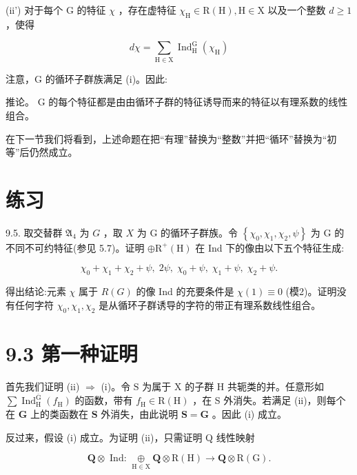 \documentclass[10pt]{article}
\begin{document}
(ii’) 对于每个 \(\mathrm{G}\) 的特征 \(\chi\) ，存在虚特征 \({\chi }_{\mathrm{H}} \in  \mathrm{R}\left( \mathrm{H}\right) ,\mathrm{H} \in  \mathrm{X}\) 以及一个整数 \(d \geq  1\) ，使得

\[
{d\chi } = \mathop{\sum }\limits_{{\mathrm{H} \in  \mathrm{X}}}{\operatorname{Ind}}_{\mathrm{H}}^{\mathrm{G}}\left( {\chi }_{\mathrm{H}}\right)
\]

注意，G 的循环子群族满足 (i)。因此:

推论。 \(\mathrm{G}\) 的每个特征都是由由循环子群的特征诱导而来的特征以有理系数的线性组合。

在下一节我们将看到，上述命题在把“有理”替换为“整数”并把“循环”替换为“初等”后仍然成立。

\section*{练习}

9.5. 取交替群 \({\mathfrak{A}}_{4}\) 为 \(G\) ，取 \(X\) 为 G 的循环子群族。令 \(\left\{  {{\chi }_{0},{\chi }_{1},{\chi }_{2},\psi }\right\}\) 为 G 的不同不可约特征(参见 5.7)。证明 \(\oplus  {\mathrm{R}}^{ + }\left( \mathrm{H}\right)\) 在 Ind 下的像由以下五个特征生成:

\[
{\chi }_{0} + {\chi }_{1} + {\chi }_{2} + \psi ,\;{2\psi },\;{\chi }_{0} + \psi ,\;{\chi }_{1} + \psi ,\;{\chi }_{2} + \psi .
\]

得出结论:元素 \(\chi\) 属于 \(R\left( G\right)\) 的像 Ind 的充要条件是 \(\chi \left( 1\right)  \equiv  0\) (模2)。证明没有任何字符 \({\chi }_{0},{\chi }_{1},{\chi }_{2}\) 是从循环子群诱导的字符的带正有理系数线性组合。

\section*{9.3 第一种证明}

首先我们证明 (ii) \(\Rightarrow\) (i)。令 \(\mathrm{S}\) 为属于 \(\mathrm{X}\) 的子群 \(\mathrm{H}\) 共轭类的并。任意形如 \(\sum {\operatorname{Ind}}_{\mathrm{H}}^{\overline{\mathrm{G}}}\left( {f}_{\mathrm{H}}\right)\) 的函数，带有 \({f}_{\mathrm{H}} \in  \mathrm{R}\left( \mathrm{H}\right)\) ，在 S 外消失。若满足 (ii)，则每个在 \(\mathbf{G}\) 上的类函数在 \(\mathbf{S}\) 外消失，由此说明 \(\mathbf{S} = \mathbf{G}\) 。因此 (i) 成立。

反过来，假设 (i) 成立。为证明 (ii)，只需证明 Q 线性映射

\[
\mathbf{Q} \otimes  \text{ Ind: }\underset{\mathrm{H} \in  \mathrm{X}}{ \oplus  }\mathbf{Q} \otimes  \mathrm{R}\left( \mathrm{H}\right)  \rightarrow  \mathbf{Q} \otimes  \mathrm{R}\left( \mathrm{G}\right) .
\]
\end{document}
